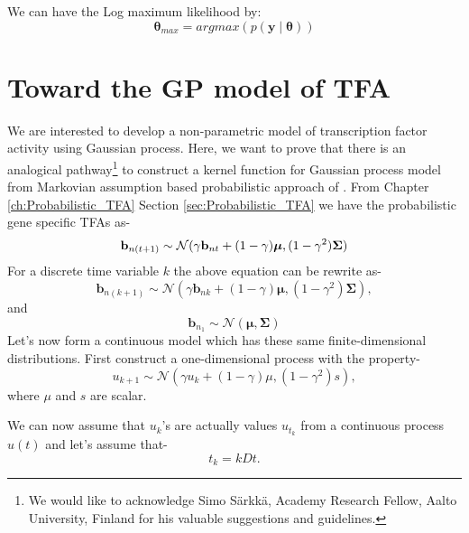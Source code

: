 We can have the Log maximum likelihood by:
\begin{equation} \label{eq:LML}
 \boldsymbol{\theta}_{max} = argmax \left( p\left(\mathbf{y}\middle|\boldsymbol{\theta}\right) \right)
\end{equation}


\section{Toward the GP model of TFA}
 We are interested to develop a non-parametric model of transcription factor activity using Gaussian process. Here, we want to prove that there is an analogical pathway\footnote{We would like to acknowledge Simo S\"arkk\"a, Academy Research Fellow, Aalto University, Finland for his valuable suggestions and guidelines.} to construct a kernel function for Gaussian process model from Markovian assumption based probabilistic approach of \cite{Sanguinetti:2006}. From Chapter \ref{ch:Probabilistic_TFA} Section \ref{sec:Probabilistic_TFA} we have the probabilistic gene specific TFAs as-
\begin{equation} \label{eq:tfa_SanG_updateCh4}
  \bold{b}_{n(t+1)} \sim \mathcal{N} (\gamma \bold{b}_{nt} + (1-\gamma)\boldsymbol{\mu},(1-\gamma^2)\bold{\Sigma})
\end{equation}
For a discrete time variable $k$ the above equation can be rewrite as-
\begin{equation}
\textbf{b}_{n(k+1)} \sim \mathcal{N}\left(\gamma \textbf{b}_{nk} + (1 - \gamma) \boldsymbol{\mu}, (1 - \gamma^2) \boldsymbol{\Sigma}\right),
\end{equation}
and
\begin{equation}
\textbf{b}_{n_1} \sim \mathcal{N}\left(\boldsymbol{\mu}, \boldsymbol{\Sigma}\right)
\end{equation}
Let's now form a continuous model which has these same finite-dimensional distributions. First construct a one-dimensional process with the property-
\begin{equation}
u_{k+1} \sim \mathcal{N}\left(\gamma u_k + \left(1 - \gamma\right) \mu, (1 - \gamma^2)s \right),
\end{equation}
where $\mu$ and $s$ are scalar.

We can now assume that $u_k$'s are actually values $u_{t_k}$ from a continuous process $u(t)$ and let's assume that- 
\begin{equation}
t_k = kDt.
\end{equation}

